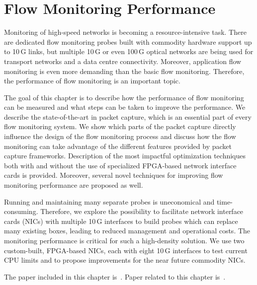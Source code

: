 \chapter{Flow Monitoring Performance}\label{chap:flow-monitoring-performance}


\begin{chapintro}

Monitoring of high-speed networks is becoming a resource-intensive task. There are dedicated flow monitoring probes built with commodity hardware support up to 10\,G links, but multiple 10\,G or even 100\,G optical networks are being used for transport networks and a data centre connectivity. Moreover, application flow monitoring is even more demanding than the basic flow monitoring. Therefore, the performance of flow monitoring is an important topic.

The goal of this chapter is to describe how the performance of flow monitoring can be measured and what steps can be taken to improve the performance. We describe the state-of-the-art in packet capture, which is an essential part of every flow monitoring system. We show which parts of the packet capture directly influence the design of the flow monitoring process and discuss how the flow monitoring can take advantage of the different features provided by packet capture frameworks. Description of the most impactful optimization techniques both with and without the use of specialized FPGA-based network interface cards is provided. Moreover, several novel techniques for improving flow monitoring performance are proposed as well.

Running and maintaining many separate probes is uneconomical and time-consuming. Therefore, we explore the possibility to facilitate network interface cards (NICs) with multiple 10\,G interfaces to build probes which can replace many existing boxes, leading to reduced management and operational costs. The monitoring performance is critical for such a high-density solution. We use two custom-built, FPGA-based NICs, each with eight 10\,G interfaces to test current CPU limits and to propose improvements for the near future commodity NICs.

The paper included in this chapter is~\cite{Velan-2015-High}. %
Paper related to this chapter is~\cite{Pus-2015-Hardware}.


\end{chapintro}
